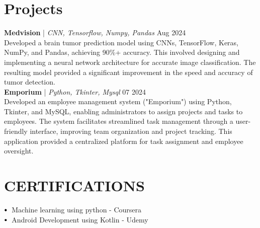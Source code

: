 \documentclass[letterpaper,11pt]{article}
\newcommand\sbullet[1][.5]{\mathbin{\vcenter{\hbox{\scalebox{#1}{$\bullet$}}}}}
\begin{document}
\section*{Projects}
\textbf{Medvision} \href{https://github.com/Priyanshu98156/MedVision}{\faExternalLink} | \textit{CNN, Tensorflow,  Numpy,  Pandas} \hfill Aug 2024 \\[2pt]
Developed a brain tumor prediction model using CNNs, TensorFlow, Keras, NumPy, and Pandas, achieving 90\%+ accuracy.  This involved designing and implementing a neural network architecture for accurate image classification. The resulting model provided a significant improvement in the speed and accuracy of tumor detection. \\[4pt]
\textbf{Emporium} \href{https://github.com/Priyanshu98156/MedVision}{\faExternalLink} | \textit{Python, Tkinter, Mysql} \hfill 07 2024 \\[2pt]
Developed an employee management system ("Emporium") using Python, Tkinter, and MySQL, enabling administrators to assign projects and tasks to employees.  The system facilitates streamlined task management through a user-friendly interface, improving team organization and project tracking.  This application provided a centralized platform for task assignment and employee oversight. \\[4pt]


\section{CERTIFICATIONS}
$\sbullet[.75] \hspace{0.1cm}$ Machine learning using python - Coursera \\
$\sbullet[.75] \hspace{0.1cm}$ Android Development using Kotlin  - Udemy \\
\end{document}

